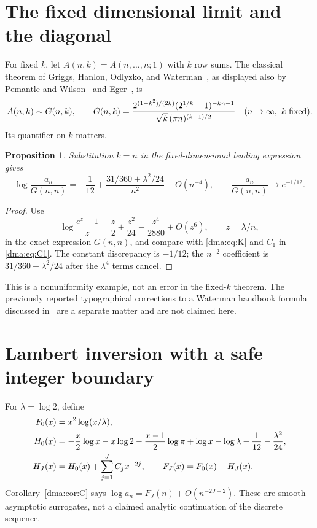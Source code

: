 \documentclass[11pt,letterpaper]{article}
\newtheorem{proposition}[theorem]{Proposition}
\theoremstyle{remark}\newtheorem{remark}[theorem]{Remark}
\begin{document}
\section{The fixed dimensional limit and the diagonal}\label{dma:sec:fixed}
For fixed $k$, let $A(n,k)=A(n,\ldots,n;1)$ with $k$ row sums. The classical theorem of Griggs, Hanlon, Odlyzko, and Waterman~\cite{ghow}, as displayed also by Pemantle and Wilson~\cite[Section 4.9]{pw} and Eger~\cite{eger}, is
\begin{equation}\label{dma:eq:G}
 A(n,k)\sim G(n,k),\qquad
 G(n,k)=\frac{2^{(1-k^2)/(2k)}(2^{1/k}-1)^{-kn-1}}
 {\sqrt k\,(\pi n)^{(k-1)/2}}\quad(n\to\infty,\ k\hbox{ fixed}).
\end{equation}
Its quantifier on $k$ matters.
\begin{proposition}\label{dma:prop:fixed}
Substitution $k=n$ in the fixed-dimensional leading expression gives
\[
 \log\frac{a_n}{G(n,n)}=-\frac1{12}
 +\frac{31/360+\lambda^2/24}{n^2}+O(n^{-4}),
 \qquad \frac{a_n}{G(n,n)}\longrightarrow e^{-1/12}.
\]
\end{proposition}
\begin{proof}
Use
\[
 \log\frac{e^z-1}{z}=\frac z2+\frac{z^2}{24}
 -\frac{z^4}{2880}+O(z^6),\qquad z=\lambda/n,
\]
in the exact expression $G(n,n)$, and compare with \eqref{dma:eq:K} and $C_1$ in \eqref{dma:eq:C1}. The constant discrepancy is $-1/12$; the $n^{-2}$ coefficient is $31/360+\lambda^2/24$ after the $\lambda^4$ terms cancel.
\end{proof}
This is a nonuniformity example, not an error in the fixed-$k$ theorem. The previously reported typographical corrections to a Waterman handbook formula discussed in~\cite{pw} are a separate matter and are not claimed here.

\section{Lambert inversion with a safe integer boundary}\label{dma:sec:inverse}
For $\lambda=\log2$, define
\begin{align}
 F_0(x)&=x^2\log(x/\lambda),\notag\\
 H_0(x)&=-\frac x2\log x-x\log2-\frac{x-1}{2}\log\pi
 +\log x-\log\lambda-\frac1{12}-\frac{\lambda^2}{24},\label{dma:eq:FH}\\
 H_J(x)&=H_0(x)+\sum_{j=1}^JC_jx^{-2j},\qquad F_J(x)=F_0(x)+H_J(x).\notag
\end{align}
Corollary~\ref{dma:cor:C} says $\log a_n=F_J(n)+O(n^{-2J-2})$. These are smooth asymptotic surrogates, not a claimed analytic continuation of the discrete sequence.
\end{document}
